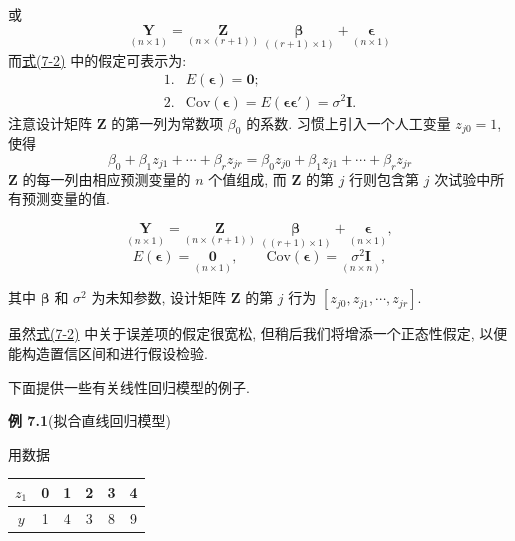 或
\[
\underset{(n\times 1)}{\mathbf{Y}}
=
\underset{(n\times(r+1))}{\mathbf{Z}}\;
\underset{((r+1)\times 1)}{\boldsymbol{\beta}}
+
\underset{(n\times 1)}{\boldsymbol{\epsilon}}
\]
而\hyperref[eq:7-2]{式(7-2)} 中的假定可表示为:
\[
\begin{array}{ll}
1. & E(\boldsymbol{\epsilon})=\mathbf{0};\\
2. & \text{Cov}(\boldsymbol{\epsilon})=E(\boldsymbol{\epsilon}\boldsymbol{\epsilon}')=\sigma^2\mathbf{I}.
\end{array}
\]
注意设计矩阵 $\mathbf{Z}$ 的第一列为常数项 $\beta_0$ 的系数. 习惯上引入一个人工变量 $z_{j0}=1$, 使得
\[
\beta_0+\beta_1 z_{j1}+\cdots+\beta_r z_{jr}=\beta_0 z_{j0}+\beta_1 z_{j1}+\cdots+\beta_r z_{jr}
\]
$\mathbf{Z}$ 的每一列由相应预测变量的 $n$ 个值组成, 而 $\mathbf{Z}$ 的第 $j$ 行则包含第 $j$ 次试验中所有预测变量的值.

\begin{mvframe}[经典线性回归模型]
\[
\underset{(n\times 1)}{\mathbf{Y}}
=
\underset{(n\times(r+1))}{\mathbf{Z}}\;
\underset{((r+1)\times 1)}{\boldsymbol{\beta}}
+
\underset{(n\times 1)}{\boldsymbol{\epsilon}},
\]
\label{eq:7-3}
\begin{equation}
E(\boldsymbol{\epsilon})=\underset{(n\times 1)}{\mathbf{0}},\qquad
\text{Cov}(\boldsymbol{\epsilon})=\underset{(n\times n)}{\sigma^2\mathbf{I}},
\tag{7-3}
\end{equation}
\end{mvframe}

其中 $\boldsymbol{\beta}$ 和 $\sigma^2$ 为未知参数, 设计矩阵 $\mathbf{Z}$ 的第 $j$ 行为 $[z_{j0},z_{j1},\cdots,z_{jr}]$.

虽然\hyperref[eq:7-2]{式(7-2)} 中关于误差项的假定很宽松, 但稍后我们将增添一个正态性假定, 以便能构造置信区间和进行假设检验.

下面提供一些有关线性回归模型的例子.

\medskip
\noindent\textbf{例 7.1}\quad (拟合直线回归模型)

用数据

\begin{mvtable}
\begin{tabular}{c|ccccc}
\hline
$z_1$&0&1&2&3&4\\
\hline
$y$&1&4&3&8&9\\
\hline
\end{tabular}
\end{mvtable}
